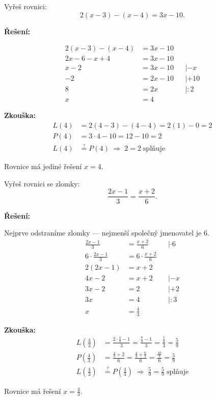 \documentclass[12pt,a4paper]{article}
\begin{document}
\begin{examplebox}
Vyřeš rovnici:
\[
2(x - 3) - (x - 4) = 3x - 10.
\]

\textbf{Řešení:}

\begin{align*}
2(x - 3) - (x - 4) &= 3x - 10\\
2x - 6 - x + 4 &= 3x - 10\\
x - 2 &= 3x - 10 &&| -x\\
-2 &= 2x - 10 &&| +10\\
8 &= 2x &&| :2\\
x &= 4
\end{align*}

\textbf{Zkouška:}
\begin{align*}
L(4) &= 2(4 - 3) - (4 - 4) = 2(1) - 0 = 2\\
P(4) &= 3 \cdot 4 - 10 = 12 - 10 = 2\\
L(4) &\stackrel{?}{=} P(4) \;\Rightarrow\; 2 = 2 \;\text{splňuje}
\end{align*}

Rovnice má jediné řešení $x = 4$.
\end{examplebox}


\begin{examplebox}
Vyřeš rovnici se zlomky:
\[
\frac{2x - 1}{3} = \frac{x + 2}{6}.
\]

\textbf{Řešení:}

Nejprve odstraníme zlomky — nejmenší společný jmenovatel je $6$.
\begin{align*}
\frac{2x - 1}{3} &= \frac{x + 2}{6} &&| \cdot 6\\
6 \cdot \frac{2x - 1}{3} &= 6 \cdot \frac{x + 2}{6}\\
2(2x - 1) &= x + 2\\
4x - 2 &= x + 2 &&| -x\\
3x - 2 &= 2 &&| +2\\
3x &= 4 &&| :3\\
x &= \frac{4}{3}
\end{align*}

\textbf{Zkouška:}
\begin{align*}
L\!\left(\tfrac{4}{3}\right) &= \frac{2 \cdot \tfrac{4}{3} - 1}{3} = \frac{\tfrac{8}{3} - 1}{3} = \frac{\tfrac{5}{3}}{3} = \tfrac{5}{9}\\
P\!\left(\tfrac{4}{3}\right) &= \frac{\tfrac{4}{3} + 2}{6} = \frac{\tfrac{4}{3} + \tfrac{6}{3}}{6} = \frac{\tfrac{10}{3}}{6} = \tfrac{5}{9}\\
L\!\left(\tfrac{4}{3}\right) &\stackrel{?}{=} P\!\left(\tfrac{4}{3}\right) \;\Rightarrow\; \tfrac{5}{9} = \tfrac{5}{9} \;\text{splňuje}
\end{align*}

Rovnice má řešení $x = \frac{4}{3}$.
\end{examplebox}
\end{document}
